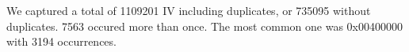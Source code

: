 We captured a total of 1109201 IV including duplicates, or 735095 without duplicates. 7563 occured more than once. The most common one was 0x00400000 with 3194 occurrences.
